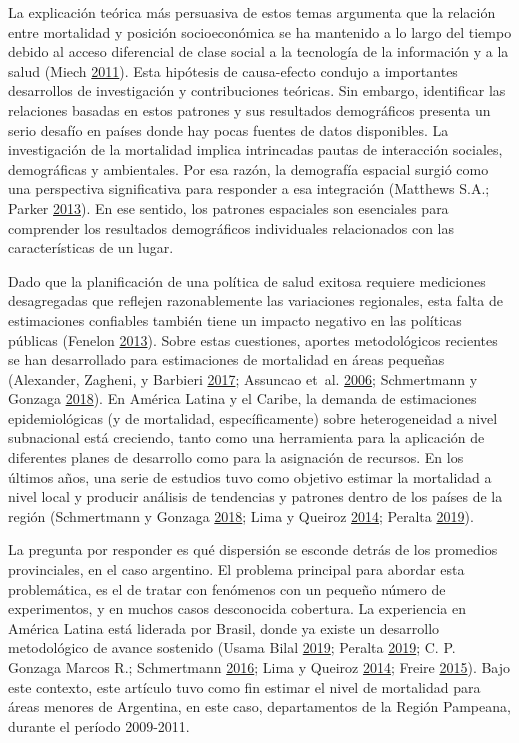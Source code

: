 \documentclass[12pt,spanish,]{article}
\begin{document}
La explicación teórica más persuasiva de estos temas argumenta que la
relación entre mortalidad y posición socioeconómica se ha mantenido a lo
largo del tiempo debido al acceso diferencial de clase social a la
tecnología de la información y a la salud (Miech
\protect\hyperlink{ref-Miech2011}{2011}). Esta hipótesis de causa-efecto
condujo a importantes desarrollos de investigación y contribuciones
teóricas. Sin embargo, identificar las relaciones basadas en estos
patrones y sus resultados demográficos presenta un serio desafío en
países donde hay pocas fuentes de datos disponibles. La investigación de
la mortalidad implica intrincadas pautas de interacción sociales,
demográficas y ambientales. Por esa razón, la demografía espacial surgió
como una perspectiva significativa para responder a esa integración
(Matthews S.A.; Parker \protect\hyperlink{ref-Matthews2013}{2013}). En
ese sentido, los patrones espaciales son esenciales para comprender los
resultados demográficos individuales relacionados con las
características de un lugar.

Dado que la planificación de una política de salud exitosa requiere
mediciones desagregadas que reflejen razonablemente las variaciones
regionales, esta falta de estimaciones confiables también tiene un
impacto negativo en las políticas públicas (Fenelon
\protect\hyperlink{ref-Fenelon2013}{2013}). Sobre estas cuestiones,
aportes metodológicos recientes se han desarrollado para estimaciones de
mortalidad en áreas pequeñas (Alexander, Zagheni, y Barbieri
\protect\hyperlink{ref-Alexander2017}{2017}; Assuncao et~al.
\protect\hyperlink{ref-AssunCao2006}{2006}; Schmertmann y Gonzaga
\protect\hyperlink{ref-Schmertmann2018}{2018}). En América Latina y el
Caribe, la demanda de estimaciones epidemiológicas (y de mortalidad,
específicamente) sobre heterogeneidad a nivel subnacional está
creciendo, tanto como una herramienta para la aplicación de diferentes
planes de desarrollo como para la asignación de recursos. En los últimos
años, una serie de estudios tuvo como objetivo estimar la mortalidad a
nivel local y producir análisis de tendencias y patrones dentro de los
países de la región (Schmertmann y Gonzaga
\protect\hyperlink{ref-Schmertmann2018}{2018}; Lima y Queiroz
\protect\hyperlink{ref-LimaQueiroz2014}{2014}; Peralta
\protect\hyperlink{ref-Peralta2019}{2019}).

La pregunta por responder es qué dispersión se esconde detrás de los
promedios provinciales, en el caso argentino. El problema principal para
abordar esta problemática, es el de tratar con fenómenos con un pequeño
número de experimentos, y en muchos casos desconocida cobertura. La
experiencia en América Latina está liderada por Brasil, donde ya existe
un desarrollo metodológico de avance sostenido (Usama Bilal
\protect\hyperlink{ref-Bilal2019}{2019}; Peralta
\protect\hyperlink{ref-Peralta2019}{2019}; C. P. Gonzaga Marcos R.;
Schmertmann \protect\hyperlink{ref-GonzagaSchmertmann2016}{2016}; Lima y
Queiroz \protect\hyperlink{ref-LimaQueiroz2014}{2014}; Freire
\protect\hyperlink{ref-FreireEtAl2015}{2015}). Bajo este contexto, este
artículo tuvo como fin estimar el nivel de mortalidad para áreas menores
de Argentina, en este caso, departamentos de la Región Pampeana, durante
el período 2009-2011.
\end{document}
